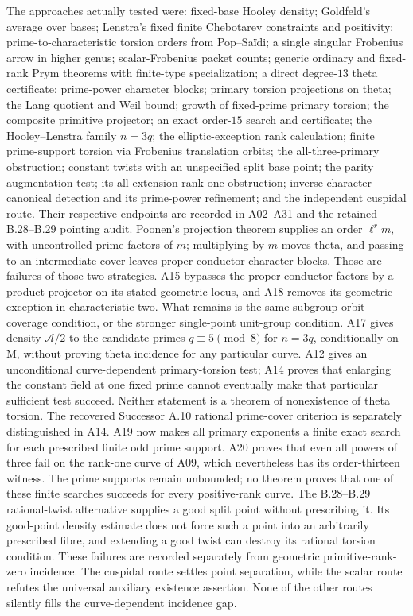 \documentclass[11pt,a4paper]{article}
\begin{document}
The approaches actually tested were: fixed-base Hooley density;
Goldfeld's average over bases; Lenstra's fixed finite Chebotarev
constraints and positivity; prime-to-characteristic torsion orders
from Pop--Sa\"idi; a single singular Frobenius arrow in higher genus;
scalar-Frobenius packet counts; generic ordinary and fixed-rank
Prym theorems with finite-type specialization; a direct degree-$13$
theta certificate; prime-power character blocks; primary torsion
projections on theta; the Lang quotient and Weil bound; growth of
fixed-prime primary torsion; the composite primitive projector;
an exact order-$15$ search and certificate; the Hooley--Lenstra
family $n=3q$; the elliptic-exception rank calculation; finite
prime-support torsion via Frobenius translation orbits; the
all-three-primary obstruction; constant twists with an unspecified
split base point; the parity augmentation test; its all-extension rank-one obstruction;
inverse-character canonical detection and its prime-power refinement;
and the independent cuspidal route.
Their respective endpoints are recorded in A02--A31 and the
retained B.28--B.29 pointing audit. Poonen's
projection theorem supplies an order $\ell^r m$, with uncontrolled
prime factors of $m$; multiplying by $m$ moves theta, and passing to
an intermediate cover leaves proper-conductor character blocks.
Those are failures of those two strategies. A15 bypasses the
proper-conductor factors by a product projector on its stated
geometric locus, and A18 removes its geometric exception in
characteristic two. What remains is the same-subgroup orbit-coverage
condition, or the stronger single-point unit-group condition.
A17 gives density $\mathcal A/2$ to the candidate primes
$q\equiv5\pmod8$ for $n=3q$, conditionally on M, without proving
theta incidence for any particular curve. A12 gives an unconditional
curve-dependent primary-torsion test; A14 proves that enlarging the
constant field at one fixed prime cannot eventually make that
particular sufficient test succeed. Neither statement is a theorem
of nonexistence of theta torsion. The recovered Successor A.10
rational prime-cover criterion is separately distinguished in A14.
A19 now makes all primary exponents a finite exact search for
each prescribed finite odd prime support. A20 proves that even
all powers of three fail on the rank-one curve of A09, which
nevertheless has its order-thirteen witness. The prime supports
remain unbounded; no theorem proves that one of these finite
searches succeeds for every positive-rank curve.
The B.28--B.29 rational-twist alternative supplies a good split
point without prescribing it. Its good-point density estimate
does not force such a point into an arbitrarily prescribed fibre,
and extending a good twist can destroy its rational torsion
condition. These failures are recorded separately from geometric
primitive-rank-zero incidence.
The cuspidal route
settles point separation, while the scalar route refutes the
universal auxiliary existence assertion. None of the other routes
silently fills the curve-dependent incidence gap.
\end{document}
